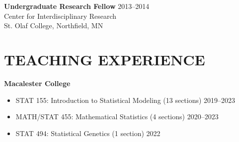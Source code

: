 \documentclass[margin]{res}
\begin{document}
\begin{resume}
\textbf{Undergraduate Research Fellow} \hfill 2013--2014 \\
Center for Interdisciplinary Research \\
St. Olaf College, Northfield, MN \\


\section{TEACHING EXPERIENCE}

\textbf{Macalester College}
\begin{itemize}
\item STAT 155: Introduction to Statistical Modeling (13 sections)  \hfill 2019--2023
\item MATH/STAT 455: Mathematical Statistics (4 sections) \hfill 2020--2023 
\item STAT 494: Statistical Genetics (1 section) \hfill 2022 \\
\end{itemize}



\end{resume}
\end{document}
